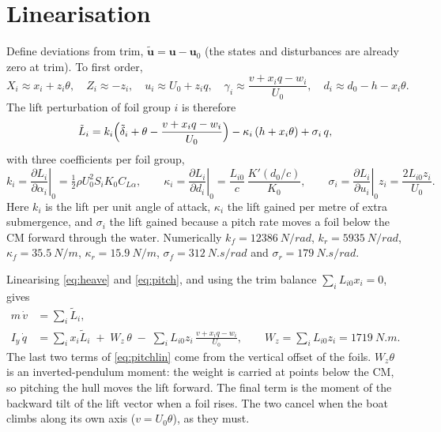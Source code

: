 \documentclass[11pt,a4paper]{article}
\newcommand{\half}{\tfrac{1}{2}}
\begin{document}
\section{Linearisation}

Define deviations from trim, $\tilde{\bm u}=\bm u-\bm u_0$ (the states and
disturbances are already zero at trim). To first order,
\[
X_i\approx x_i+z_i\theta,\quad Z_i\approx -z_i,\quad
u_i\approx U_0+z_i q,\quad
\gamma_i\approx\frac{v+x_i q-w_i}{U_0},\quad
d_i\approx d_0-h-x_i\theta .
\]
The lift perturbation of foil group $i$ is therefore
\begin{equation}
\tilde L_i = k_i\Bigl(\tilde\delta_i+\theta-\frac{v+x_i q-w_i}{U_0}\Bigr)
             -\kappa_i\,(h+x_i\theta) + \sigma_i\,q ,
\label{eq:Ltilde}
\end{equation}
with three coefficients per foil group,
\begin{equation}
k_i=\left.\frac{\partial L_i}{\partial\alpha_i}\right|_0
   =\half\rho U_0^2 S_i K_0 C_{L\alpha},
\qquad
\kappa_i=\left.\frac{\partial L_i}{\partial d_i}\right|_0
   =\frac{L_{i0}}{c}\,\frac{K'(d_0/c)}{K_0},
\qquad
\sigma_i=\left.\frac{\partial L_i}{\partial u_i}\right|_0 z_i
   =\frac{2L_{i0}z_i}{U_0}.
\end{equation}
Here $k_i$ is the lift per unit angle of attack, $\kappa_i$ the lift gained per
metre of extra submergence, and $\sigma_i$ the lift gained because a pitch rate
moves a foil below the CM forward through the water. Numerically
$k_f=\SI{12386}{N/rad}$, $k_r=\SI{5935}{N/rad}$,
$\kappa_f=\SI{35.5}{N/m}$, $\kappa_r=\SI{15.9}{N/m}$,
$\sigma_f=\SI{312}{N.s/rad}$ and $\sigma_r=\SI{179}{N.s/rad}$.

Linearising \eqref{eq:heave} and \eqref{eq:pitch}, and using the trim balance
$\sum_i L_{i0}x_i=0$, gives
\begin{align}
m\,\dot v &= \sum_i \tilde L_i, \\
I_y\,\dot q &= \sum_i x_i\tilde L_i
   \;+\; W_z\,\theta \;-\; \sum_i L_{i0}z_i\,\frac{v+x_i q-w_i}{U_0},
\qquad W_z=\sum_i L_{i0}z_i=\SI{1719}{N.m}.
\label{eq:pitchlin}
\end{align}
The last two terms of \eqref{eq:pitchlin} come from the vertical offset of the
foils. $W_z\theta$ is an inverted-pendulum moment: the weight is carried at points
below the CM, so pitching the hull moves the lift forward. The final term is the
moment of the backward tilt of the lift vector when a foil rises. The two cancel
when the boat climbs along its own axis ($v=U_0\theta$), as they must.
\end{document}
